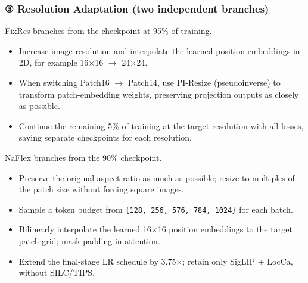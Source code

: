 \subsubsection{{③} Resolution Adaptation (two independent branches)}
FixRes branches from the checkpoint at 95\% of training.\allowbreak{}\par
\begin{itemize}
\item Increase image resolution and interpolate the learned position embeddings in 2D, for example 16\(\times\)16 \(\rightarrow\) 24\(\times\)24.\allowbreak{}
\item When switching Patch16 \(\rightarrow\) Patch14, use PI-\allowbreak{}Resize (pseudoinverse) to transform patch-\allowbreak{}embedding weights, preserving projection outputs as closely as possible.\allowbreak{}
\item Continue the remaining 5\% of training at the target resolution with all losses, saving separate checkpoints for each resolution.\allowbreak{}
\end{itemize}
NaFlex branches from the 90\% checkpoint.\allowbreak{}\par
\begin{itemize}
\item Preserve the original aspect ratio as much as possible; resize to multiples of the patch size without forcing square images.\allowbreak{}
\item Sample a token budget from \texttt{\{128, 256, 576, 784, 1024\}} for each batch.\allowbreak{}
\item Bilinearly interpolate the learned 16\(\times\)16 position embeddings to the target patch grid; mask padding in attention.\allowbreak{}
\item Extend the final-\allowbreak{}stage LR schedule by 3.\allowbreak{}75\(\times\); retain only SigLIP + LocCa, without SILC/\allowbreak{}TIPS.\allowbreak{}
\end{itemize}
